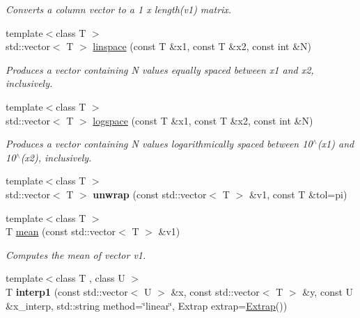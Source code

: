 \begin{DoxyCompactItemize}
\begin{DoxyCompactList}\small\item\em Converts a column vector to a 1 x length(v1) matrix. \end{DoxyCompactList}\item 
{\footnotesize template$<$class T $>$ }\\std\-::vector$<$ T $>$ \hyperlink{namespacekeycpp_a4e8769de1f22713d3564350d53125b26}{linspace} (const T \&x1, const T \&x2, const int \&N)
\begin{DoxyCompactList}\small\item\em Produces a vector containing N values equally spaced between x1 and x2, inclusively. \end{DoxyCompactList}\item 
{\footnotesize template$<$class T $>$ }\\std\-::vector$<$ T $>$ \hyperlink{namespacekeycpp_a1704b4adc18c9353ee63fa63539df54d}{logspace} (const T \&x1, const T \&x2, const int \&N)
\begin{DoxyCompactList}\small\item\em Produces a vector containing N values logarithmically spaced between 10$^\wedge$(x1) and 10$^\wedge$(x2), inclusively. \end{DoxyCompactList}\item 
\hypertarget{namespacekeycpp_afb7e6400d879e910f6bf8eb7270d5a64}{{\footnotesize template$<$class T $>$ }\\std\-::vector$<$ T $>$ {\bfseries unwrap} (const std\-::vector$<$ T $>$ \&v1, const T \&tol=pi)}\label{namespacekeycpp_afb7e6400d879e910f6bf8eb7270d5a64}

\item 
\hypertarget{namespacekeycpp_ad1acd03db6a49523cb5dbe751a80917a}{{\footnotesize template$<$class T $>$ }\\T \hyperlink{namespacekeycpp_ad1acd03db6a49523cb5dbe751a80917a}{mean} (const std\-::vector$<$ T $>$ \&v1)}\label{namespacekeycpp_ad1acd03db6a49523cb5dbe751a80917a}

\begin{DoxyCompactList}\small\item\em Computes the mean of vector v1. \end{DoxyCompactList}\item 
\hypertarget{namespacekeycpp_a640a5654108c737a52e781ee1794571b}{{\footnotesize template$<$class T , class U $>$ }\\T {\bfseries interp1} (const std\-::vector$<$ U $>$ \&x, const std\-::vector$<$ T $>$ \&y, const U \&x\-\_\-interp, std\-::string method=\char`\"{}linear\char`\"{}, Extrap extrap=\hyperlink{classkeycpp_1_1_extrap}{Extrap}())}\label{namespacekeycpp_a640a5654108c737a52e781ee1794571b}


\end{DoxyCompactItemize}
